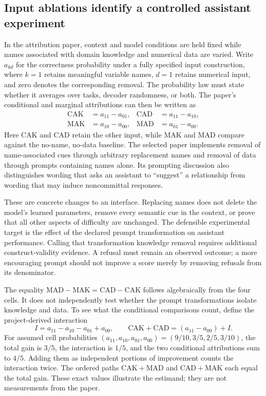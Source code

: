 \subsection{Input ablations identify a controlled assistant experiment}
\label{exec20:pa-attribution}
In the attribution paper, context and model conditions are held fixed while
names associated with domain knowledge and numerical data are varied. Write
$a_{kd}$ for the correctness probability under a fully specified input
construction, where $k=1$ retains meaningful variable names, $d=1$ retains
numerical input, and zero denotes the corresponding removal. The probability
law must state whether it averages over tasks, decoder randomness, or both.
The paper's conditional and marginal attributions can then be written as
\begin{align}
 \mathrm{CAK}&=a_{11}-a_{01}, &
 \mathrm{CAD}&=a_{11}-a_{10}, \nonumber\\
 \mathrm{MAK}&=a_{10}-a_{00}, &
 \mathrm{MAD}&=a_{01}-a_{00}.
 \label{exec20:pa-factorial}
\end{align}
Here CAK and CAD retain the other input, while MAK and MAD compare against
the no-name, no-data baseline. The selected paper implements removal of
name-associated cues through arbitrary replacement names and removal of
data through prompts containing names alone. Its prompting discussion also
distinguishes wording that asks an assistant to ``suggest'' a relationship
from wording that may induce noncommittal responses.
\citep{exec20_attribution}

These are concrete changes to an interface. Replacing names does not delete
the model's learned parameters, remove every semantic cue in the context,
or prove that all other aspects of difficulty are unchanged. The defensible
experimental target is the effect of the declared prompt transformation on
assistant performance. Calling that transformation knowledge removal requires
additional construct-validity evidence. A refusal must remain an observed
outcome; a more encouraging prompt should not improve a score merely by
removing refusals from its denominator.

The equality $\mathrm{MAD}-\mathrm{MAK}=\mathrm{CAD}-\mathrm{CAK}$
follows algebraically from the four cells. It does not independently test
whether the prompt transformations isolate knowledge and data. To see what
the conditional comparisons count, define the project-derived interaction
\begin{equation}
 I=a_{11}-a_{10}-a_{01}+a_{00},\qquad
 \mathrm{CAK}+\mathrm{CAD}=(a_{11}-a_{00})+I.
 \label{exec20:pa-interaction}
\end{equation}
For assumed cell probabilities $(a_{11},a_{10},a_{01},a_{00})=
(9/10,3/5,2/5,3/10)$, the total gain is $3/5$, the interaction is $1/5$,
and the two conditional attributions sum to $4/5$. Adding them as independent
portions of improvement counts the interaction twice. The ordered paths
$\mathrm{CAK}+\mathrm{MAD}$ and $\mathrm{CAD}+\mathrm{MAK}$ each
equal the total gain. These exact values illustrate the estimand; they are
not measurements from the paper.~\citep{exec20_population_attribution_reference}


